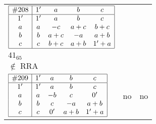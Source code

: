 \documentclass[12pt]{article}
\theoremstyle{definition}
\newcommand\RRA{\operatorname{RRA}}
\newcommand\notRRA{\ensuremath{\notin \RRA}}
\newcommand{\join}{\mathbin{+}}%
\newcommand{\id}{{1'}}%
\renewcommand{\div}{0'}
\begin{document}
\begin{center}
\begin{longtable}{l|c|c}
$
\begin{array}{|c|cccc|} \hline
\#208 & \id & a & b & c \\ \hline
\id & \id & a & b & c \\
a & a & -c & a \join c & b \join c \\
b & b & a \join c & -a & a \join b \\
c & c & b \join c & a \join b & \id \join a \\ \hline
\end{array}
$
 & \begin{tabular}{c} yes \\ $41_{65}$ \\ \notRRA \end{tabular} 
 & \adjustbox{valign=c, max height=1.6cm}{$
\left[ \begin{array}{cccccc}
\id & a & a & b & b & b \\ 
a & \id & a & a & c & a \\ 
a & a & \id & a & c & a \\ 
b & a & a & \id & b & b \\ 
b & c & c & b & \id & c \\ 
b & a & a & b & c & \id
\end{array}\right]
$}      \\[15mm]

$
\begin{array}{|c|cccc|} \hline
\#209 & \id & a & b & c \\ \hline
\id & \id & a & b & c \\
a & a & -b & c & \div \\
b & b & c & -a & a \join b \\
c & c & \div & a \join b & \id \join a \\ \hline
\end{array}
$
 & no  
 & no     \\[15mm]


\end{longtable}
\end{center}
\end{document}
